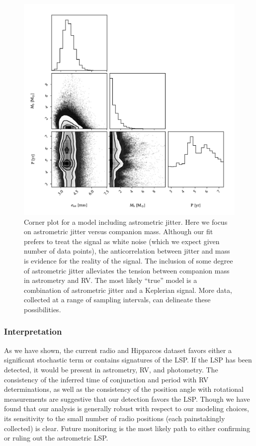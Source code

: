\documentclass[twocolumn]{aastex631}
\begin{document}
\begin{figure}
    \centering
    \includegraphics[width=\linewidth]{figures/jitter_mass.pdf}
    \caption{ Corner plot for a model including astrometric jitter. Here we focus on astrometric jitter versus companion mass. Although our fit prefers to treat the signal as white noise (which we expect given number of data points), the anticorrelation between jitter and mass is evidence for the reality of the signal. The inclusion of some degree of astrometric jitter alleviates the tension between companion mass in astrometry and RV. The most likely ``true'' model is a combination of astrometric jitter and a Keplerian signal. More data, collected at a range of sampling intervals, can delineate these possibilities. }
    \label{fig:jitter}
\end{figure}


\subsubsection{Interpretation}
As we have shown, the current radio and Hipparcos dataset favors either a significant stochastic term or contains signatures of the LSP. If the LSP has been detected, it would be present in astrometry, RV, and photometry. The consistency of the inferred time of conjunction and period with RV determinations, as well as the consistency of the position angle with rotational measurements are suggestive that our detection favors the LSP. Though we have found that our analysis is generally robust with respect to our modeling choices, its sensitivity to the small number of radio positions (each painstakingly collected) is clear. Future monitoring is the most likely path to either confirming or ruling out the astrometric LSP. 
\end{document}
